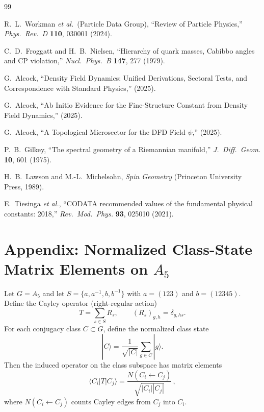 \documentclass[11pt,a4paper]{article}
\begin{document}
\begin{thebibliography}{99}

 R.~L.~Workman \textit{et al.}\ (Particle Data Group),
``Review of Particle Physics,''
\textit{Phys.\ Rev.\ D} \textbf{110}, 030001 (2024).

 C.~D.~Froggatt and H.~B.~Nielsen,
``Hierarchy of quark masses, Cabibbo angles and CP violation,''
\textit{Nucl.\ Phys.\ B} \textbf{147}, 277 (1979).

 G.~Alcock,
``Density Field Dynamics: Unified Derivations, Sectoral Tests, and
Correspondence with Standard Physics,'' (2025).

 G.~Alcock,
``Ab Initio Evidence for the Fine-Structure Constant from Density Field Dynamics,'' (2025).

 G.~Alcock,
``A Topological Microsector for the DFD Field $\psi$,'' (2025).

 P.~B.~Gilkey,
``The spectral geometry of a Riemannian manifold,''
\textit{J.\ Diff.\ Geom.} \textbf{10}, 601 (1975).

 H.~B.~Lawson and M.-L.~Michelsohn,
\textit{Spin Geometry} (Princeton University Press, 1989).

 E.~Tiesinga \textit{et al.},
``CODATA recommended values of the fundamental physical constants: 2018,''
\textit{Rev.\ Mod.\ Phys.} \textbf{93}, 025010 (2021).

\end{thebibliography}

\appendix
\section{Appendix: Normalized Class-State Matrix Elements on $A_5$}
\label{app:class}

Let $G=A_5$ and let $S=\{a,a^{-1},b,b^{-1}\}$ with $a=(123)$ and $b=(12345)$.
Define the Cayley operator (right-regular action)
\[
T = \sum_{s\in S} R_s,\qquad (R_s)_{g,h}=\delta_{g,hs}.
\]
For each conjugacy class $C\subset G$, define the normalized class state
\[
|C\rangle = \frac{1}{\sqrt{|C|}}\sum_{g\in C} |g\rangle.
\]
Then the induced operator on the class subspace has matrix elements
\[
\langle C_i|T|C_j\rangle = \frac{N(C_i\leftarrow C_j)}{\sqrt{|C_i||C_j|}}\,,
\]
where $N(C_i\leftarrow C_j)$ counts Cayley edges from $C_j$ into $C_i$.
\end{document}
